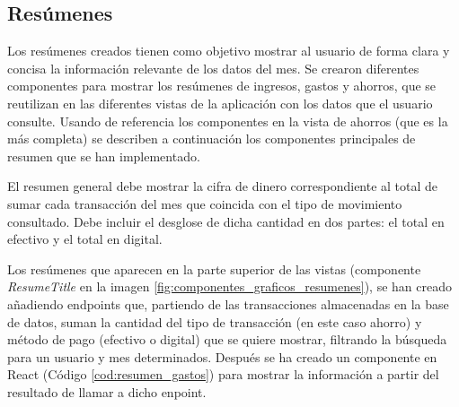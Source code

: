\subsection{Resúmenes}
Los resúmenes creados tienen como objetivo mostrar al usuario de forma clara y concisa la información relevante de los datos del mes. Se crearon diferentes componentes para mostrar los resúmenes de ingresos, gastos y ahorros, que se reutilizan en las diferentes vistas de la aplicación con los datos que el usuario consulte. Usando de referencia los componentes en la vista de ahorros (que es la más completa) se describen a continuación los componentes principales de resumen que se han implementado.


El resumen general debe mostrar la cifra de dinero correspondiente al total de sumar cada transacción del mes que coincida con el tipo de movimiento consultado. Debe incluir el desglose de dicha cantidad en dos partes: el total en efectivo y el total en digital.

Los resúmenes que aparecen en la parte superior de las vistas (componente \textit{ResumeTitle} en la imagen \ref{fig:componentes_graficos_resumenes}), se han creado añadiendo endpoints que, partiendo de las transacciones almacenadas en la base de datos, suman la cantidad del tipo de transacción (en este caso ahorro) y método de pago (efectivo o digital) que se quiere mostrar, filtrando la búsqueda para un usuario y mes determinados. Después se ha creado un componente en React (Código \ref{cod:resumen_gastos}) para mostrar la información a partir del resultado de llamar a dicho enpoint.


